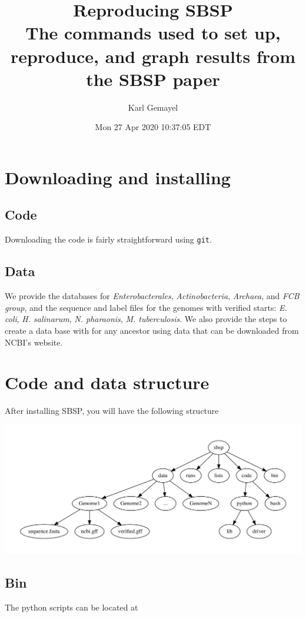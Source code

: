 \documentclass[11pt]{article}
\author{Karl Gemayel}
\date{Mon 27 Apr 2020 10:37:05 EDT}
\title{Reproducing SBSP\\\medskip
\large The commands used to set up, reproduce, and graph results from the SBSP paper}
\begin{document}
\maketitle
\setcounter{tocdepth}{2}
\tableofcontents


\section{Downloading and installing}
\label{sec:org094ae03}
\subsection{Code}
\label{sec:orgd6446fa}
Downloading the code is fairly straightforward using \texttt{git}.

\subsection{Data}
\label{sec:orgcc1b9e1}
We provide the databases for \emph{Enterobacterales}, \emph{Actinobacteria}, \emph{Archaea}, and \emph{FCB group}, and the sequence and label files for the genomes with verified starts: \emph{E. coli}, \emph{H. salinarum}, \emph{N. pharaonis}, \emph{M. tuberculosis}. We also provide the steps to create a data base with for any ancestor using data that can be downloaded from NCBI's website.

\section{Code and data structure}
\label{sec:org70f89c6}
After installing SBSP, you will have the following structure

\begin{center}
\includegraphics[width=.9\linewidth]{dir.pdf}
\end{center}

\subsection{Bin}
\label{sec:orgb22d4c4}
The python scripts can be located at 
\end{document}
